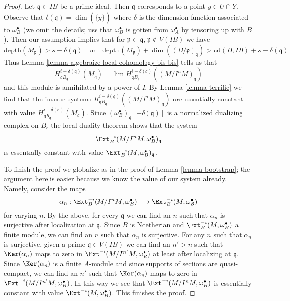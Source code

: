 \begin{proof}
\medskip\noindent
Let $\mathfrak q \subset IB$ be a prime ideal. Then $\mathfrak q$ corresponds
to a point $y \in U \cap Y$. Observe that
$\delta(\mathfrak q) = \dim(\overline{\{y\}})$
where $\delta$ is the dimension function associated to $\omega_B^\bullet$
(we omit the details; use that $\omega_B^\bullet$ is gotten from
$\omega_A^\bullet$ by tensoring up with $B$). Then our assumption
implies that for $\mathfrak p \subset \mathfrak q$,
$\mathfrak p \not \in V(IB)$ we have
$$
\text{depth}(M_\mathfrak p) > s - \delta(\mathfrak q)
\quad\text{or}\quad
\text{depth}(M_\mathfrak p) + \dim((B/\mathfrak p)_\mathfrak q) > 
\text{cd}(B, IB) + s - \delta(\mathfrak q)
$$
Thus Lemma \ref{lemma-algebraize-local-cohomology-bis-bis} tells us that
$$
H^{i - \delta(\mathfrak q)}_{\mathfrak qB_\mathfrak q}(M_\mathfrak q) =
\lim H^{i - \delta(\mathfrak q)}_{\mathfrak qB_\mathfrak q}(
(M/I^nM)_\mathfrak q)
$$
and this module is annihilated by a power of $I$.
By Lemma \ref{lemma-terrific} we find that the inverse systems
$H^{i - \delta(\mathfrak q)}_{\mathfrak qB_\mathfrak q}((M/I^nM)_\mathfrak q)$
are essentially constant with value
$H^{i - \delta(\mathfrak q)}_{\mathfrak qB_\mathfrak q}(M_\mathfrak q)$.
Since $(\omega_B^\bullet)_\mathfrak q[-\delta(\mathfrak q)]$ is a normalized
dualizing complex on $B_\mathfrak q$ the local duality theorem
shows that the system
$$
\Ext^{-i}_B(M/I^n M, \omega_B^\bullet)_\mathfrak q
$$
is essentially constant with value
$\Ext^{-i}_B(M, \omega_B^\bullet)_\mathfrak q$.

\medskip\noindent
To finish the proof we globalize as in the proof of
Lemma \ref{lemma-bootstrap}; the argument here is easier
because we know the value of our system already. Namely, consider the maps
$$
\alpha_n :
\Ext^{-i}_B(M/I^n M, \omega_B^\bullet)
\longrightarrow
\Ext^{-i}_B(M, \omega_B^\bullet)
$$
for varying $n$. By the above, for every $\mathfrak q$ we can find an
$n$ such that $\alpha_n$ is surjective after localization at $\mathfrak q$.
Since $B$ is Noetherian and $\Ext^{-i}_B(M, \omega_B^\bullet)$
a finite module, we can find an $n$ such that $\alpha_n$ is surjective.
For any $n$ such that $\alpha_n$ is surjective, given a prime
$\mathfrak q \in V(IB)$ we can find an $n' > n$ such that
$\Ker(\alpha_n)$ maps to zero in $\Ext^{-i}(M/I^{n'}M, \omega_B^\bullet)$
at least after localizing at $\mathfrak q$.
Since $\Ker(\alpha_n)$ is a finite $A$-module and since supports of
sections are quasi-compact, we can find an $n'$ such that
$\Ker(\alpha_n)$ maps to zero in $\Ext^{-i}(M/I^{n'}M, \omega_B^\bullet)$.
In this way we see that $\Ext^{-i}(M/I^n M, \omega_B^\bullet)$
is essentially constant with value $\Ext^{-i}(M, \omega_B^\bullet)$.
This finishes the proof.
\end{proof}












